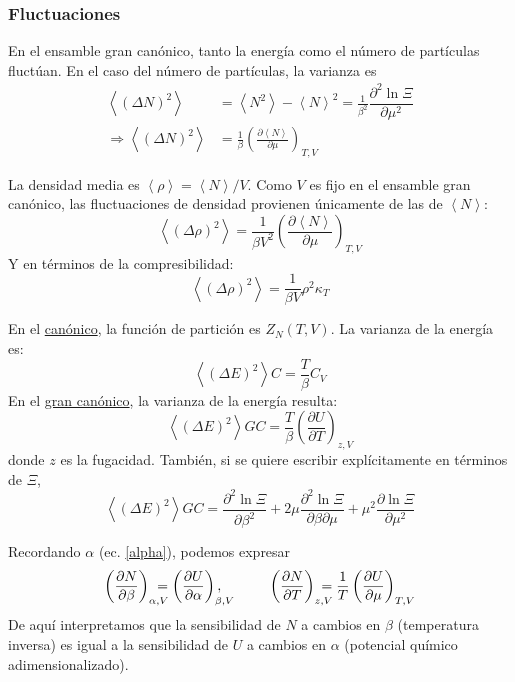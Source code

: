 \documentclass[]{article}
\numberwithin{equation}{section}
\newcommand{\deriv}[3]{\left(\frac{\partial #1}{\partial #2} \right)_{#3}}
\newcommand{\0}{\textcolor{gray}{0}}
\newcommand{\pd}[2]{\dfrac{\partial #1}{\partial #2}}
\newcommand{\pr}[1]{\left\langle #1 \right\rangle }
\begin{document}
\subsubsection{Fluctuaciones}
En el ensamble gran canónico, tanto la energía como el número de partículas fluctúan. En el caso del número de partículas, la varianza es
\begin{align}
	\pr{ (\Delta N)^2} &= \left\langle N^2\right\rangle - \pr{N}^2 = \frac{1}{\beta^2}\pd{^2 \ln\Xi}{\mu^2}\\
	\Rightarrow \pr{ (\Delta N)^2} &= \frac{1}{\beta} \deriv{\pr{N}}{\mu}{T,V}
\end{align}

La densidad media es \(\left\langle \rho\right\rangle = \pr{N}/V\). Como \(V\) es fijo en el ensamble gran canónico, las fluctuaciones de densidad provienen únicamente de las de \(\pr{N}\):
\begin{equation}
	\pr{ (\Delta \rho)^2} = \frac{1}{\beta V^2} \deriv{\pr{N}}{\mu}{T,V}
\end{equation}
Y en términos de la compresibilidad:
\begin{equation}
	\pr{ (\Delta \rho)^2} = \frac{1}{\beta V} \rho^2 \kappa_T
\end{equation}

En el \underline{canónico}, la función de partición es \(Z_N (T,V)\). La varianza de la energía es:
\begin{equation}
	\pr{ (\Delta E)^2}{C} = \frac{T}{\beta} C_V
\end{equation}
En el \underline{gran canónico}, la varianza de la energía resulta:
\begin{equation}
	\pr{ (\Delta E)^2}{GC} = \frac{T}{\beta} \deriv{U}{T}{z,V}
\end{equation}
donde \(z\) es la fugacidad. También, si se quiere escribir explícitamente en términos de \(\Xi\),
\begin{equation}
	\pr{ (\Delta E)^2}{GC} = \pd{^2 \ln\Xi}{\beta^2} + 2\mu \pd{^2 \ln\Xi}{\beta\partial\mu} + \mu^2\pd{\ln\Xi}{\mu^2}
\end{equation}

Recordando \(\alpha\) (ec. \ref{alpha}), podemos expresar
\begin{equation}
	\deriv{N}{\beta}{\alpha,V}\hspace{-4mm} = \deriv{U}{\alpha}{\beta,V}\hspace{-5mm}, ~~~~~~~~~~ \deriv{N}{T}{z,V}\hspace{-4mm} = \frac{1}{T} \deriv{U}{\mu}{T,V}
\end{equation}
De aquí interpretamos que la sensibilidad de \(N\) a cambios en \(\beta\) (temperatura inversa) es igual a la sensibilidad de \(U\) a cambios en \(\alpha\) (potencial químico adimensionalizado).
\end{document}
